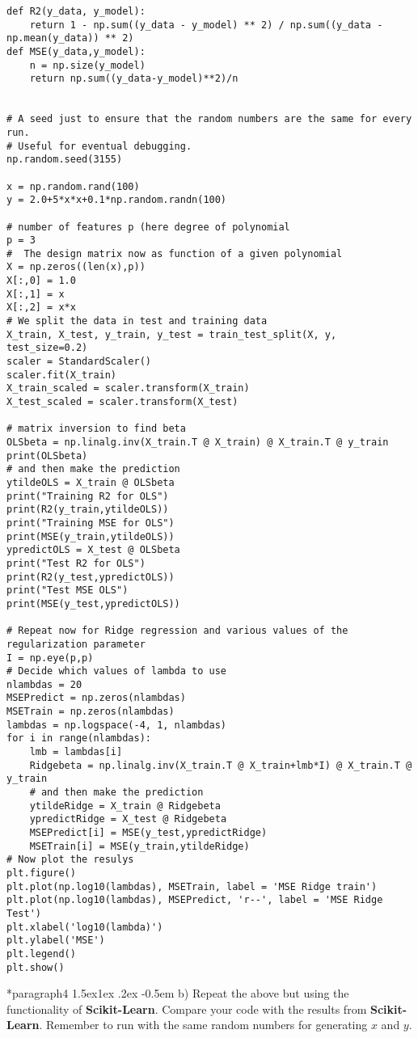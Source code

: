 \documentclass[%
oneside,                 %
final,                   %
10pt]{article}
\makeatletter
\newenvironment{doconceexercise}{}{}
\newcommand\subex{\@startsection*{paragraph}{4}{\z@}%
                  {1.5ex\@plus1ex \@minus.2ex}%
                  {-0.5em}%
                  {\normalfont\normalsize\bfseries}}
\makeatother
\begin{document}
\begin{doconceexercise}
\begin{verbatim}
def R2(y_data, y_model):
    return 1 - np.sum((y_data - y_model) ** 2) / np.sum((y_data - np.mean(y_data)) ** 2)
def MSE(y_data,y_model):
    n = np.size(y_model)
    return np.sum((y_data-y_model)**2)/n


# A seed just to ensure that the random numbers are the same for every run.
# Useful for eventual debugging.
np.random.seed(3155)

x = np.random.rand(100)
y = 2.0+5*x*x+0.1*np.random.randn(100)

# number of features p (here degree of polynomial
p = 3
#  The design matrix now as function of a given polynomial
X = np.zeros((len(x),p))
X[:,0] = 1.0
X[:,1] = x
X[:,2] = x*x
# We split the data in test and training data
X_train, X_test, y_train, y_test = train_test_split(X, y, test_size=0.2)
scaler = StandardScaler()
scaler.fit(X_train)
X_train_scaled = scaler.transform(X_train)
X_test_scaled = scaler.transform(X_test)

# matrix inversion to find beta
OLSbeta = np.linalg.inv(X_train.T @ X_train) @ X_train.T @ y_train
print(OLSbeta)
# and then make the prediction
ytildeOLS = X_train @ OLSbeta
print("Training R2 for OLS")
print(R2(y_train,ytildeOLS))
print("Training MSE for OLS")
print(MSE(y_train,ytildeOLS))
ypredictOLS = X_test @ OLSbeta
print("Test R2 for OLS")
print(R2(y_test,ypredictOLS))
print("Test MSE OLS")
print(MSE(y_test,ypredictOLS))

# Repeat now for Ridge regression and various values of the regularization parameter
I = np.eye(p,p)
# Decide which values of lambda to use
nlambdas = 20
MSEPredict = np.zeros(nlambdas)
MSETrain = np.zeros(nlambdas)
lambdas = np.logspace(-4, 1, nlambdas)
for i in range(nlambdas):
    lmb = lambdas[i]
    Ridgebeta = np.linalg.inv(X_train.T @ X_train+lmb*I) @ X_train.T @ y_train
    # and then make the prediction
    ytildeRidge = X_train @ Ridgebeta
    ypredictRidge = X_test @ Ridgebeta
    MSEPredict[i] = MSE(y_test,ypredictRidge)
    MSETrain[i] = MSE(y_train,ytildeRidge)
# Now plot the resulys
plt.figure()
plt.plot(np.log10(lambdas), MSETrain, label = 'MSE Ridge train')
plt.plot(np.log10(lambdas), MSEPredict, 'r--', label = 'MSE Ridge Test')
plt.xlabel('log10(lambda)')
plt.ylabel('MSE')
plt.legend()
plt.show()
\end{verbatim}


\subex{b)}
Repeat the above but using the functionality of \textbf{Scikit-Learn}. Compare your code with the results from \textbf{Scikit-Learn}. Remember to run with the same random numbers for generating $x$ and $y$.



\end{doconceexercise}
\end{document}
